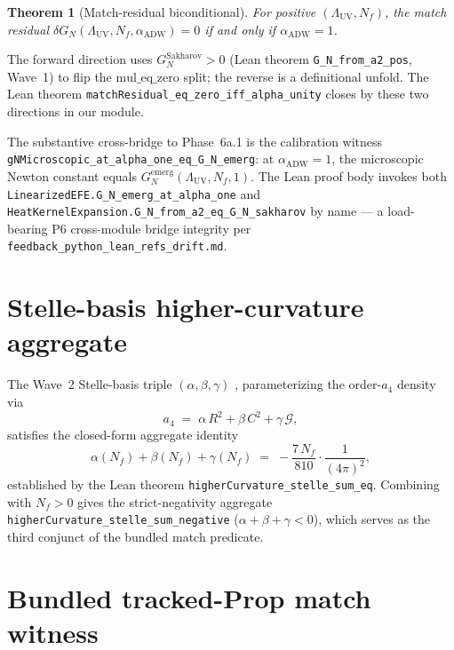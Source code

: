 \documentclass[twocolumn]{revtex4-2}
\newtheorem{theorem}{Theorem}
\newcommand{\Nf}{N_f}
\newcommand{\LambdaUV}{\Lambda_{\mathrm{UV}}}
\newcommand{\aADW}{\alpha_{\mathrm{ADW}}}
\newcommand{\GN}{G_{N}}
\newcommand{\GNem}{G_{N}^{\mathrm{emerg}}}
\newcommand{\GNsak}{G_{N}^{\mathrm{Sakharov}}}
\begin{document}
\begin{theorem}[Match-residual biconditional]
\label{thm:match-bicond}
For positive $(\LambdaUV,\Nf)$, the match residual
$\delta\GN(\LambdaUV,\Nf,\aADW) = 0$ if and only if
$\aADW = 1$.
\end{theorem}

The forward direction uses $\GNsak > 0$ (Lean theorem
\texttt{G\_N\_from\_a2\_pos}, Wave~1) to flip the
$\mathrm{mul\_eq\_zero}$ split; the reverse is a definitional unfold.
The Lean theorem
\texttt{matchResidual\_eq\_zero\_iff\_alpha\_unity}
closes by these two directions in our module.

The substantive cross-bridge to Phase~6a.1 is the calibration witness
\texttt{gNMicroscopic\_at\_alpha\_one\_eq\_G\_N\_emerg}: at $\aADW=1$,
the microscopic Newton constant equals
$\GNem(\LambdaUV,\Nf,1)$. The Lean proof body invokes both
\texttt{LinearizedEFE.G\_N\_emerg\_at\_alpha\_one}
\cite{LinearizedEFE2026} and
\texttt{HeatKernelExpansion.G\_N\_from\_a2\_eq\_G\_N\_sakharov}
\cite{Roehm2026Wave1} by name --- a load-bearing P6 cross-module
bridge integrity per
\texttt{feedback\_python\_lean\_refs\_drift.md}.

\section{Stelle-basis higher-curvature aggregate}

The Wave~2 Stelle-basis triple $(\alpha,\beta,\gamma)$
\cite{HigherCurvature2026,Stelle1977}, parameterizing the order-$a_{4}$
density via
\[
  a_{4}\;=\;\alpha\, R^{2}+\beta\,C^{2}+\gamma\,\mathcal{G},
\]
satisfies the closed-form aggregate identity
\begin{equation}
  \alpha(\Nf)+\beta(\Nf)+\gamma(\Nf)
    \;=\; -\frac{7\,\Nf}{810}\cdot\frac{1}{(4\pi)^{2}},
  \label{eq:stelle-sum}
\end{equation}
established by the Lean theorem
\texttt{higherCurvature\_stelle\_sum\_eq}. Combining with
$\Nf > 0$ gives the strict-negativity aggregate
\texttt{higherCurvature\_stelle\_sum\_negative}
($\alpha+\beta+\gamma < 0$), which serves as the third conjunct of
the bundled match predicate.

\section{Bundled tracked-Prop match witness}
\end{document}
